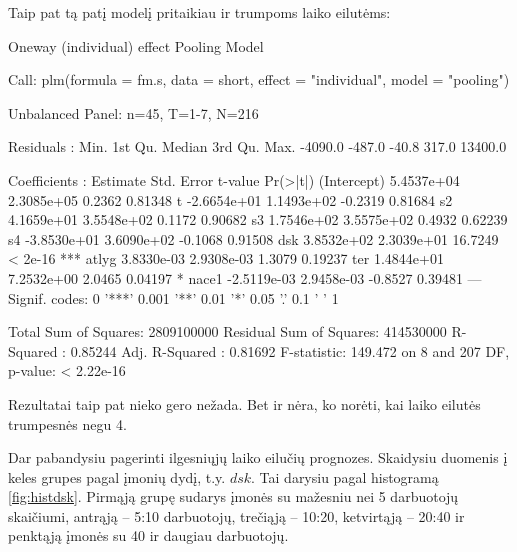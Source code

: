 \documentclass[a4paper]{article}
\begin{document}
Taip pat tą patį modelį pritaikiau ir trumpoms laiko eilutėms:
\begin{Schunk}
\begin{Soutput}
Oneway (individual) effect Pooling Model

Call:
plm(formula = fm.s, data = short, effect = "individual", model = "pooling")

Unbalanced Panel: n=45, T=1-7, N=216

Residuals :
   Min. 1st Qu.  Median 3rd Qu.    Max. 
-4090.0  -487.0   -40.8   317.0 13400.0 

Coefficients :
               Estimate  Std. Error t-value Pr(>|t|)    
(Intercept)  5.4537e+04  2.3085e+05  0.2362  0.81348    
t           -2.6654e+01  1.1493e+02 -0.2319  0.81684    
s2           4.1659e+01  3.5548e+02  0.1172  0.90682    
s3           1.7546e+02  3.5575e+02  0.4932  0.62239    
s4          -3.8530e+01  3.6090e+02 -0.1068  0.91508    
dsk          3.8532e+02  2.3039e+01 16.7249  < 2e-16 ***
atlyg        3.8330e-03  2.9308e-03  1.3079  0.19237    
ter          1.4844e+01  7.2532e+00  2.0465  0.04197 *  
nace1       -2.5119e-03  2.9458e-03 -0.8527  0.39481    
---
Signif. codes:  0 '***' 0.001 '**' 0.01 '*' 0.05 '.' 0.1 ' ' 1 

Total Sum of Squares:    2809100000
Residual Sum of Squares: 414530000
R-Squared      :  0.85244 
      Adj. R-Squared :  0.81692 
F-statistic: 149.472 on 8 and 207 DF, p-value: < 2.22e-16
\end{Soutput}
\end{Schunk}

Rezultatai taip pat nieko gero nežada. Bet ir nėra, ko norėti, kai
laiko eilutės trumpesnės negu 4.

Dar pabandysiu pagerinti ilgesniųjų laiko eilučių prognozes. Skaidysiu
duomenis į keles grupes pagal įmonių dydį, t.y. $dsk$. Tai darysiu
pagal histogramą \ref{fig:histdsk}. Pirmąją grupę sudarys įmonės su
mažesniu nei 5
darbuotojų skaičiumi, antrąją -- 5:10  darbuotojų, trečiąją -- 10:20,
ketvirtąją -- 20:40 ir penktąją įmonės su 40 ir daugiau darbuotojų.
\end{document}
